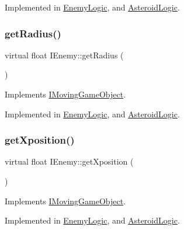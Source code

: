 Implemented in \hyperlink{class_enemy_logic_a8eb47a87a47288783e0c8963c39d24e4}{Enemy\+Logic}, and \hyperlink{class_asteroid_logic_a00c9cda893b9dee7e2225377dd54a2eb}{Asteroid\+Logic}.

\mbox{\label{class_i_enemy_ab1fb8f6320916ef6a1497f9651704d05}} 
\subsubsection{\texorpdfstring{get\+Radius()}{getRadius()}}
{\footnotesize\ttfamily virtual float I\+Enemy\+::get\+Radius (\begin{DoxyParamCaption}{ }\end{DoxyParamCaption})\hspace{0.3cm}{\ttfamily [pure virtual]}}



Implements \hyperlink{class_i_moving_game_object_ab2120f126d088beda46654aa3ccfd705}{I\+Moving\+Game\+Object}.



Implemented in \hyperlink{class_enemy_logic_ab6736c870e69bc20bef8d6d010946eb2}{Enemy\+Logic}, and \hyperlink{class_asteroid_logic_a575d9f801770906960b65dafe937fba5}{Asteroid\+Logic}.

\mbox{\label{class_i_enemy_a504ea7fa77b8984d5b9dd71352876943}} 
\subsubsection{\texorpdfstring{get\+Xposition()}{getXposition()}}
{\footnotesize\ttfamily virtual float I\+Enemy\+::get\+Xposition (\begin{DoxyParamCaption}{ }\end{DoxyParamCaption})\hspace{0.3cm}{\ttfamily [pure virtual]}}



Implements \hyperlink{class_i_moving_game_object_acc7f0195491b1843558c8c558cbc7363}{I\+Moving\+Game\+Object}.



Implemented in \hyperlink{class_enemy_logic_a7eed969ab8e3d2527cdac04ef39a5aba}{Enemy\+Logic}, and \hyperlink{class_asteroid_logic_a1d79a614c5e1a9409404f6a2def25761}{Asteroid\+Logic}.

